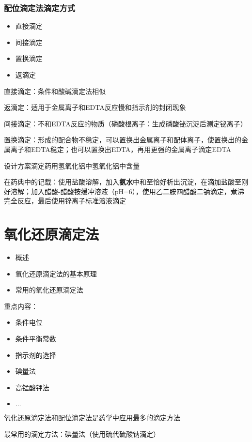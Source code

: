 \subsubsection*{配位滴定法滴定方式}%
\label{subsub:配位滴定法滴定方式}
\begin{itemize}
    \item 直接滴定
    \item 间接滴定
    \item 置换滴定
    \item 返滴定
\end{itemize}
\begin{notation}
直接滴定：条件和酸碱滴定法相似
\end{notation}
\begin{notation}
    返滴定：适用于金属离子和EDTA反应慢和指示剂的封闭现象
\end{notation}
\begin{notation}
间接滴定：不和EDTA反应的物质（磷酸根离子：生成磷酸铋沉淀后测定铋离子）
\end{notation}
\begin{notation}
置换滴定：形成的配合物不稳定，可以置换出金属离子和配体离子，使置换出的金属离子和EDTA稳定；也可以置换出EDTA，再用更强的金属离子滴定EDTA
\end{notation}
\begin{eg}
设计方案滴定药用氢氧化铝中氢氧化铝中含量
\end{eg}
在药典中的记载：使用盐酸溶解，加入\textbf{氨水}中和至恰好析出沉淀，在滴加盐酸至刚好溶解；加入醋酸-醋酸铵缓冲溶液（pH=6），使用乙二胺四醋酸二钠滴定，煮沸完全反应，最后使用锌离子标准溶液滴定
\section{氧化还原滴定法}%
\label{sec:氧化还原滴定法}
\begin{itemize}
    \item 概述
    \item 氧化还原滴定法的基本原理
    \item 常用的氧化还原滴定法
\end{itemize}
重点内容：
\begin{itemize}
    \item 条件电位
    \item 条件平衡常数
    \item 指示剂的选择
    \item 碘量法
    \item 高锰酸钾法
    \item $\ldots $
\end{itemize}
\begin{notation}
氧化还原滴定法和配位滴定法是药学中应用最多的滴定方法
\end{notation}
最常用的滴定方法：碘量法（使用硫代硫酸钠滴定）


